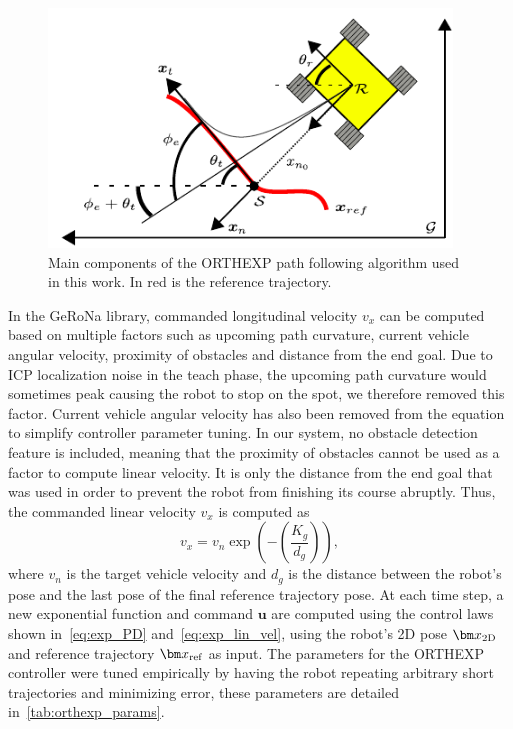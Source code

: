 \begin{figure}
	\centering
	\includegraphics[height=2.5in]{figs/path_follower/orthexp.pdf}
	\caption{Main components of the \ac{ORTHEXP} path following algorithm used in this work.
	In red is the reference trajectory.}
	\label{fig:diff_orthexp}
\end{figure}

In the \ac{GeRoNa} library, commanded longitudinal velocity $v_x$ can be computed based on multiple factors such as upcoming path curvature, current vehicle angular velocity, proximity of obstacles and distance from the end goal.
Due to \ac{ICP} localization noise in the teach phase, the upcoming path curvature would sometimes peak causing the robot to stop on the spot, we therefore removed this factor.
Current vehicle angular velocity has also been removed from the equation to simplify controller parameter tuning.
In our system, no obstacle detection feature is included, meaning that the proximity of obstacles cannot be used as a factor to compute linear velocity.
It is only the distance from the end goal that was used in order to prevent the robot from finishing its course abruptly.
Thus, the commanded linear velocity $v_x$ is computed as
\begin{equation}
\label{eq:exp_lin_vel}
v_x = v_n \exp\left(-\left(\frac{K_g}{d_g}\right)\right),
\end{equation}
where $v_n$ is the target vehicle velocity and $d_g$ is the distance between the robot's pose and the last pose of the final reference trajectory pose. 
At each time step, a new exponential function and command $\bm u$ are computed using the control laws shown in~\autoref{eq:exp_PD} and~\autoref{eq:exp_lin_vel}, using the robot's 2D pose $\poseplane$ and reference trajectory $\reftraj$ as input.
The parameters for the \ac{ORTHEXP} controller were tuned empirically by having the robot repeating arbitrary short trajectories and minimizing error, these parameters are detailed in~\autoref{tab:orthexp_params}.


